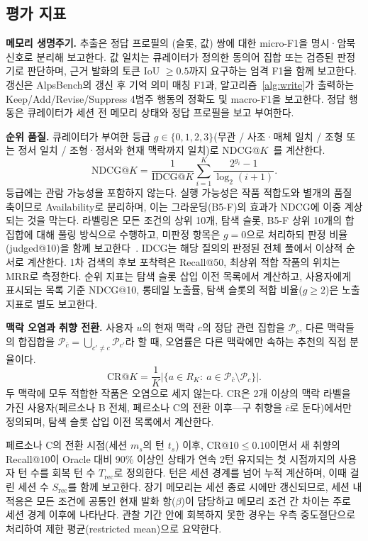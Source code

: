 \documentclass[10pt,twocolumn,letterpaper]{article}
\newcommand{\cP}{\mathcal{P}}
\begin{document}
\subsection{평가 지표}
\label{sec:metrics}

\textbf{메모리 생명주기.} 추출은 정답 프로필의 (슬롯, 값) 쌍에 대한 micro-F1을 명시·암묵 신호로 분리해 보고한다. 값 일치는 큐레이터가 정의한 동의어 집합 또는 검증된 판정기로 판단하며, 근거 발화의 토큰 IoU $\ge 0.5$까지 요구하는 엄격 F1을 함께 보고한다. 갱신은 AlpsBench의 갱신 후 기억 의미 매칭 F1과, 알고리즘~\ref{alg:write}가 출력하는 Keep/Add/Revise/Suppress 4범주 행동의 정확도 및 macro-F1을 보고한다. 정답 행동은 큐레이터가 세션 전 메모리 상태와 정답 프로필을 보고 부여한다.

\textbf{순위 품질.} 큐레이터가 부여한 등급 $g\in\{0,1,2,3\}$(무관 / 사조·매체 일치 / 조형 또는 정서 일치 / 조형·정서와 현재 맥락까지 일치)로 NDCG@$K$~\cite{jarvelin2002ndcg}를 계산한다.
\begin{equation}
\mathrm{NDCG@}K=\frac{1}{\mathrm{IDCG@}K}\sum_{i=1}^{K}\frac{2^{g_i}-1}{\log_2(i+1)}.
\label{eq:ndcg}
\end{equation}
등급에는 관람 가능성을 포함하지 않는다. 실행 가능성은 작품 적합도와 별개의 품질 축이므로 Availability로 분리하며, 이는 그라운딩(B5-F)의 효과가 NDCG에 이중 계상되는 것을 막는다. 라벨링은 모든 조건의 상위 10개, 탐색 슬롯, B5-F 상위 10개의 합집합에 대해 풀링 방식으로 수행하고, 미판정 항목은 $g=0$으로 처리하되 판정 비율(judged@10)을 함께 보고한다~\cite{buckley2004incomplete}. IDCG는 해당 질의의 판정된 전체 풀에서 이상적 순서로 계산한다. 1차 검색의 후보 포착력은 Recall@50, 최상위 적합 작품의 위치는 MRR로 측정한다. 순위 지표는 탐색 슬롯 삽입 이전 목록에서 계산하고, 사용자에게 표시되는 목록 기준 NDCG@10, 롱테일 노출률, 탐색 슬롯의 적합 비율($g\ge2$)은 노출 지표로 별도 보고한다.

\textbf{맥락 오염과 취향 전환.} 사용자 $u$의 현재 맥락 $c$의 정답 관련 집합을 $\cP_c$, 다른 맥락들의 합집합을 $\cP_{\bar c}=\bigcup_{c'\ne c}\cP_{c'}$라 할 때, 오염률은 다른 맥락에만 속하는 추천의 직접 분율이다.
\begin{equation}
\mathrm{CR@}K=\frac{1}{K}\bigl|\{a\in R_K:\ a\in\cP_{\bar c}\setminus\cP_c\}\bigr|.
\label{eq:cr}
\end{equation}
두 맥락에 모두 적합한 작품은 오염으로 세지 않는다. CR은 2개 이상의 맥락 라벨을 가진 사용자(페르소나 B 전체, 페르소나 C의 전환 이후—구 취향을 $\bar c$로 둔다)에서만 정의되며, 탐색 슬롯 삽입 이전 목록에서 계산한다.

페르소나 C의 전환 시점(세션 $m_s$의 턴 $t_s$) 이후, CR@10$\le0.10$이면서 새 취향의 Recall@10이 Oracle 대비 90\% 이상인 상태가 연속 2턴 유지되는 첫 시점까지의 사용자 턴 수를 회복 턴 수 $T_{\mathrm{rec}}$로 정의한다. 턴은 세션 경계를 넘어 누적 계산하며, 이때 걸린 세션 수 $S_{\mathrm{rec}}$를 함께 보고한다. 장기 메모리는 세션 종료 시에만 갱신되므로, 세션 내 적응은 모든 조건에 공통인 현재 발화 항($\beta$)이 담당하고 메모리 조건 간 차이는 주로 세션 경계 이후에 나타난다. 관찰 기간 안에 회복하지 못한 경우는 우측 중도절단으로 처리하여 제한 평균(restricted mean)으로 요약한다.
\end{document}
